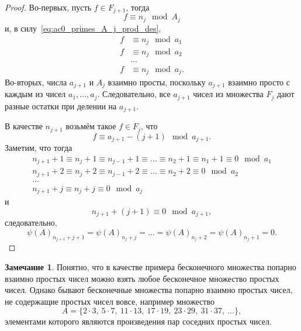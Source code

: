 \documentclass[a4paper,openbib]{article}
\theoremstyle{definition}
\newtheorem{remark}[lemma]{Замечание}
\begin{document}
\begin{proof}
	Во-первых, пусть $f \in F_{j+1}$,
	тогда
	\begin{equation}
		f \equiv n_j \mod A_j
	\end{equation}
	и, в силу~\eqref{eq:ac0_primes_A_j_prod_des},
	\begin{equation}
		\begin{array}{rl}
		f &\equiv n_j \mod a_1
		\\
		f &\equiv n_j \mod a_2
		\\
		&\dots
		\\
		f &\equiv n_j \mod a_j
		.
		\end{array}
	\end{equation}
	Во-вторых, числа $a_{j+1}$ и $A_j$ взаимно просты, поскольку $a_{j+1}$ взаимно просто с каждым из чисел $a_1,...,a_j$.
	Следовательно, все $a_{j+1}$ чисел из множества $F_j$ дают разные остатки при делении на $a_{j+1}$.

	В качестве $n_{j+1}$ возьмём такое $f\in F_j$, что
	\begin{equation}
		f \equiv a_{j+1} - (j+1) \mod a_{j+1}
		.
	\end{equation}
	Заметим, что тогда
	\begin{equation}
		\begin{array}{l}
			n_{j+1} + 1 \equiv n_j + 1 \equiv n_{j-1} + 1 \equiv \dots \equiv n_2 + 1 \equiv n_1 + 1 \equiv 0 \mod a_1
			\\
			n_{j+1} + 2 \equiv n_j + 2 \equiv n_{j-1} + 2 \equiv \dots \equiv n_2 + 2 \equiv 0 \mod a_2
			\\
			\dots
			\\
			n_{j+1} + j \equiv n_j + j  \equiv 0 \mod a_j
		\end{array}
	\end{equation}
	и
	\begin{equation}
		n_{j+1} + (j+1) \equiv 0 \mod a_{j+1}
		,
	\end{equation}
	следовательно,
	\begin{equation}
		\psi(A)_{n_{j+1} + j+1} = \psi(A)_{n_{j} + j} = \dots = \psi(A)_{n_{j} + 2} = \psi(A)_{n_{j} + 1} = 0
		.
	\end{equation}


\end{proof}

\begin{remark}
	Понятно, что в качестве примера бесконечного множества
	попарно взаимно простых чисел можно взять любое бесконечное множество простых чисел.
	Однако бывают бесконечные множества попарно взаимно простых чисел,
	не содержащие простых чисел вовсе, например множество
	\begin{equation}
		A = \{ 2\cdot 3,~5 \cdot 7,~11 \cdot 13,~17\cdot 19,~23\cdot29,~31\cdot 37,~...\},
	\end{equation}
	элементами которого являются произведения пар соседних простых чисел.
\end{remark}
\end{document}
